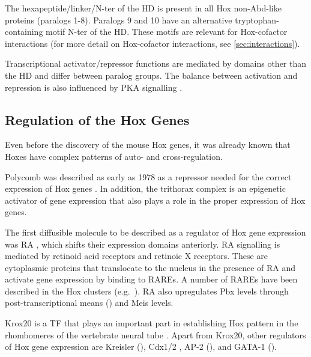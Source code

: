 The hexapeptide/linker/\ac{N-ter} of the \ac{HD} is present in all Hox non-Abd-like proteins (paralogs 1-8). Paralogs 9 and 10 have an alternative tryptophan-containing motif \ac{N-ter} of the \ac{HD}. These motifs are relevant for Hox-cofactor interactions (for more detail on Hox-cofactor interactions, see \ref{sec:interactions}).

Transcriptional activator/repressor functions are mediated by domains other than the \ac{HD} and differ between paralog groups. The balance between activation and repression is also influenced by \ac{PKA} signalling \parencite{Saleh2000a}.

\subsection{Regulation of the Hox Genes}

Even before the discovery of the mouse Hox genes, it was already known that Hoxes have complex patterns of auto- and cross-regulation. 


Polycomb was described as early as 1978 as a repressor needed for the correct expression of Hox genes \parencite{Lewis1978}. In addition, the trithorax complex is an epigenetic activator of gene expression that also plays a role in the proper expression of Hox genes.%

The first diffusible molecule to be described as a regulator of Hox gene expression was \ac{RA} \parencite{Simeone1990}, which shifts their expression domains anteriorly. \ac{RA} signalling is mediated by retinoid acid receptors and retinoic X receptors. These are cytoplasmic proteins that translocate to the nucleus in the presence of \ac{RA} and activate gene expression by binding to \acp{RARE}. A number of \acp{RARE} have been described in the Hox clusters (e.g.\ \textcite{Poepperl1993, Langston1997}). \ac{RA} also upregulates Pbx levels through post-transcriptional means (\cite{Knoepfler1997a}) and Meis levels. %

Krox20 is a \ac{TF} that plays an important part in establishing Hox pattern in the rhombomeres of the vertebrate neural tube \parencite{Swiatek1993}. Apart from Krox20, other regulators of Hox gene expression are Kreisler (\cite{Manzanares1999}), Cdx1/2 \parencite{Lohnes2003}, AP-2 (\cite{Doerksen1996, Maconochie1999, Ding2013}), and GATA-1 (\cite{Vieille-Grosjean1995, Gosiengfiao2007}).   %


